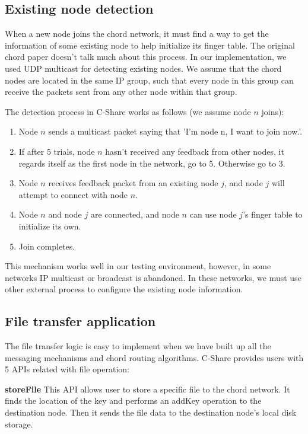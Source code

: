 \documentclass[letterpaper,twocolumn,10pt]{article}
\begin{document}
\subsection{Existing node detection}
When a new node joins the chord network, it must find a way to get the information of some existing node to help initialize its finger table. The original chord paper doesn't talk much about this process. In our implementation, we used UDP multicast for detecting existing nodes. We assume that the chord nodes are located in the same IP group, such that every node in this group can receive the packets sent from any other node within that group.

The detection process in C-Share works as follows (we assume node $n$ joins):

\begin{enumerate}
	\item Node $n$ sends a multicast packet saying that 'I'm node n, I want to join now.'.
	\item  If after 5 trials, node $n$ hasn't received any feedback from other nodes, it regards itself as the first node in the network, go to 5. Otherwise go to 3.
	\item Node $n$ receives feedback packet from an existing node $j$, and node $j$ will attempt to connect with node $n$.
	\item Node $n$ and node $j$ are connected, and node $n$ can use node $j$'s finger table to initialize its own.
	\item Join completes.

\end{enumerate}

This mechanism works well in our testing environment, however, in some networks IP multicast or broadcast is abandoned. In these networks, we must use other external process to configure the existing node information.

\subsection{File transfer application}
The file transfer logic is easy to implement when we have built up all the messaging mechanisms and chord routing algorithms. C-Share provides users with 5 APIs related with file operation:

\noindent \textbf{storeFile} This API allows user to store a specific file to the chord network. It finds the location of the key and performs an addKey operation to the destination node. Then it sends the file data to the destination node's local disk storage.
\end{document}
